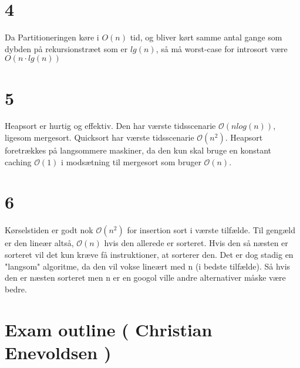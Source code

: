\documentclass[12pt]{article}
\begin{document}
{\begin{comment}
Introsort_loop(A, i, j, Counter)
	while j-i >= 32
		if Counter = 0
			then Heapsort(A, i, j)
				return
		Counter := Counter - 1
		p := Partition(A, i, j, Median_of_3(
			A[i], A[i+(j-i)/2], A[j-1]))
		Introsort_loop(A, p, j, Counter)
		j := p
\end{lstlisting}
\end{comment}


\section*{4}
Da Partitioneringen køre i $O(n)$ tid, og bliver kørt samme antal gange som dybden på rekursionstræet som er $lg(n)$, så må worst-case for introsort være $O(n\cdot lg(n))$
\section*{5}

Heapsort er hurtig og effektiv. Den har værste tidsscenarie $\mathcal{O}(nlog(n))$, ligesom mergesort. Quicksort har værste tidsscenarie $\mathcal{O}(n^2)$. Heapsort foretrækkes på langsommere maskiner, da den kun skal bruge en konstant caching $\mathcal{O}(1)$ i modsætning til mergesort som bruger $\mathcal{O}(n)$. 

\section*{6}

Kørselstiden er godt nok $\mathcal{O}(n^2)$ for insertion sort i værste tilfælde. Til gengæld er den lineær altså, $\mathcal{O}(n)$ hvis den allerede er sorteret. Hvis den så næsten er sorteret vil det kun kræve få instruktioner, at sorterer den. Det er dog stadig en "langsom" algoritme, da den vil vokse lineært med n (i bedste tilfælde). Så hvis den er næsten sorteret men n er en googol ville andre alternativer måske være bedre.

\newpage
\section*{Exam outline ( Christian Enevoldsen )}

}
\end{document}
